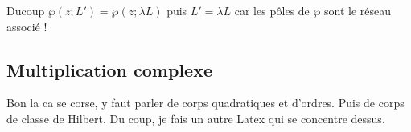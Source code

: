 \documentclass[12pt]{article}
\begin{document}
Ducoup $\wp(z;L')=\wp(z;\lambda L)$ puis $L'=\lambda L$ car les pôles de $\wp$ sont le réseau associé !

\subsection{Multiplication complexe}
Bon la ca se corse, y faut parler de corps quadratiques et d'ordres. Puis de corps de classe de Hilbert. Du coup,
je fais un autre Latex qui se concentre dessus.
\end{document}
